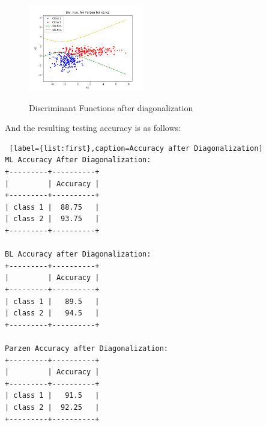 \documentclass[11pt, oneside]{article}   	%
\begin{document}
\begin{figure}
\begin{center}
{	\includegraphics[width=0.45\textwidth]{x1-x2-Disc-func-parzen-after.png}
	\label{absorbing}
	}
\end{center}
\caption{Discriminant Functions after diagonalization}
\end{figure}
\break
And the resulting testing accuracy is as follows:
\begin{lstlisting} [label={list:first},caption=Accuracy after Diagonalization]
ML Accuracy After Diagonalization:
+---------+----------+
|         | Accuracy |
+---------+----------+
| class 1 |  88.75   |
| class 2 |  93.75   |
+---------+----------+

BL Accuracy after Diagonalization:
+---------+----------+
|         | Accuracy |
+---------+----------+
| class 1 |   89.5   |
| class 2 |   94.5   |
+---------+----------+

Parzen Accuracy after Diagonalization:
+---------+----------+
|         | Accuracy |
+---------+----------+
| class 1 |   91.5   |
| class 2 |  92.25   |
+---------+----------+

\end{lstlisting}
\end{document}
